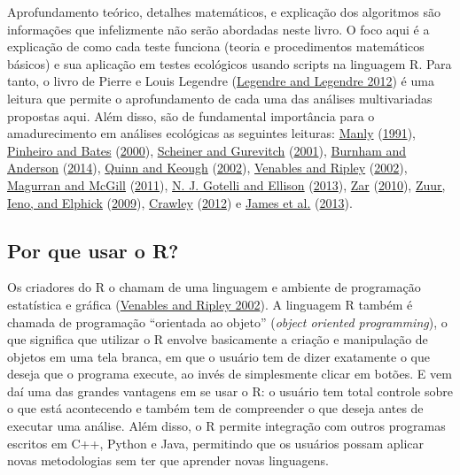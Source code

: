 \documentclass[
]{article}
\begin{document}
Aprofundamento teórico, detalhes matemáticos, e explicação dos algoritmos são informações que infelizmente não serão abordadas neste livro. O foco aqui é a explicação de como cada teste funciona (teoria e procedimentos matemáticos básicos) e sua aplicação em testes ecológicos usando scripts na linguagem R. Para tanto, o livro de Pierre e Louis Legendre (\protect\hyperlink{ref-legendre_numerical_2012}{Legendre and Legendre 2012}) é uma leitura que permite o aprofundamento de cada uma das análises multivariadas propostas aqui. Além disso, são de fundamental importância para o amadurecimento em análises ecológicas as seguintes leituras: \protect\hyperlink{ref-manly_randomization_1991}{Manly} (\protect\hyperlink{ref-manly_randomization_1991}{1991}), \protect\hyperlink{ref-pinheiro_mixed-effects_2000}{Pinheiro and Bates} (\protect\hyperlink{ref-pinheiro_mixed-effects_2000}{2000}), \protect\hyperlink{ref-scheiner_design_2001}{Scheiner and Gurevitch} (\protect\hyperlink{ref-scheiner_design_2001}{2001}), \protect\hyperlink{ref-burnham_pvalues_2014}{Burnham and Anderson} (\protect\hyperlink{ref-burnham_pvalues_2014}{2014}), \protect\hyperlink{ref-quinn_experimental_2002}{Quinn and Keough} (\protect\hyperlink{ref-quinn_experimental_2002}{2002}), \protect\hyperlink{ref-venables_modern_2002}{Venables and Ripley} (\protect\hyperlink{ref-venables_modern_2002}{2002}), \protect\hyperlink{ref-magurran_biological_2011}{Magurran and McGill} (\protect\hyperlink{ref-magurran_biological_2011}{2011}), \protect\hyperlink{ref-gotelli_primer_2013}{N. J. Gotelli and Ellison} (\protect\hyperlink{ref-gotelli_primer_2013}{2013}), \protect\hyperlink{ref-zar_biostatistical_2010}{Zar} (\protect\hyperlink{ref-zar_biostatistical_2010}{2010}), \protect\hyperlink{ref-zuur_protocol_2009}{Zuur, Ieno, and Elphick} (\protect\hyperlink{ref-zuur_protocol_2009}{2009}), \protect\hyperlink{ref-crawley_r_2012}{Crawley} (\protect\hyperlink{ref-crawley_r_2012}{2012}) e \protect\hyperlink{ref-james_introduction_2013}{James et al.} (\protect\hyperlink{ref-james_introduction_2013}{2013}).

\hypertarget{por-que-usar-o-r}{%
\subsection{Por que usar o R?}\label{por-que-usar-o-r}}

Os criadores do R o chamam de uma linguagem e ambiente de programação estatística e gráfica (\protect\hyperlink{ref-venables_modern_2002}{Venables and Ripley 2002}). A linguagem R também é chamada de programação ``orientada ao objeto'' (\emph{object oriented programming}), o que significa que utilizar o R envolve basicamente a criação e manipulação de objetos em uma tela branca, em que o usuário tem de dizer exatamente o que deseja que o programa execute, ao invés de simplesmente clicar em botões. E vem daí uma das grandes vantagens em se usar o R: o usuário tem total controle sobre o que está acontecendo e também tem de compreender o que deseja antes de executar uma análise. Além disso, o R permite integração com outros programas escritos em C++, Python e Java, permitindo que os usuários possam aplicar novas metodologias sem ter que aprender novas linguagens.
\end{document}
